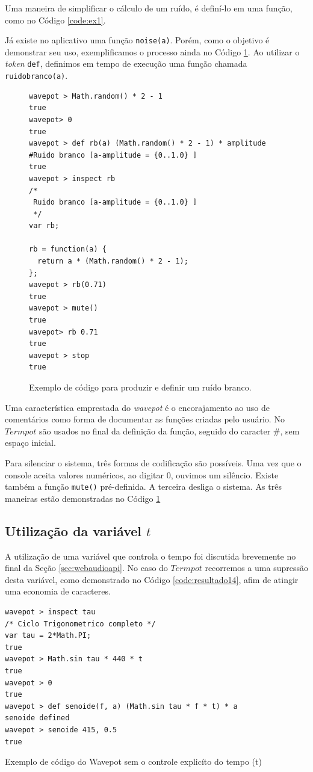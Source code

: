 Uma maneira de simplificar o cálculo de um ruído, é definí-lo em uma função, como no Código \ref{code:ex1}. 

Já existe no aplicativo uma função \verb|noise(a)|.
Porém, como o objetivo é demonstrar seu uso, exemplificamos o processo ainda no Código \ref{code:resultado7}.
Ao  utilizar o \emph{token} \verb|def|, definimos em tempo de execução uma função chamada \verb|ruidobranco(a)|.

\begin{figure}[ht!]
\begin{verbatim}
wavepot > Math.random() * 2 - 1
true
wavepot> 0
true
wavepot > def rb(a) (Math.random() * 2 - 1) * amplitude #Ruido branco [a-amplitude = {0..1.0} ]
true
wavepot > inspect rb
/*
 Ruido branco [a-amplitude = {0..1.0} ]
 */
var rb;

rb = function(a) {
  return a * (Math.random() * 2 - 1);
};
wavepot > rb(0.71)
true
wavepot > mute()
true
wavepot> rb 0.71
true
wavepot > stop
true
\end{verbatim}
\caption{Exemplo de código para produzir e definir um ruído branco.}
\label{code:resultado7}
\end{figure}

Uma característica emprestada do \emph{wavepot} é o encorajamento ao uso de comentários como forma de documentar as funções criadas pelo usuário.
No $Termpot$ são usados no final da definição da função, seguido do caracter \#, sem espaço inicial.

Para silenciar o sistema, três formas de codificação são possíveis.
Uma vez que o console aceita valores numéricos, ao digitar 0, ouvimos um silêncio.
Existe também a função \verb|mute()| pré-definida.
A terceira desliga o sistema.
As três maneiras estão demonstradas no Código \ref{code:resultado7}

\subsection*{Utilização da variável $t$}

A utilização de uma variável que controla o tempo foi discutida brevemente no final da Seção \ref{sec:webaudioapi}.
No caso do $Termpot$ recorremos a uma supressão desta variável, como demonstrado no Código \ref{code:resultado14}, afim de atingir uma economia de caracteres.

\begin{listing}
\begin{verbatim}
wavepot > inspect tau
/* Ciclo Trigonometrico completo */
var tau = 2*Math.PI;
true
wavepot > Math.sin tau * 440 * t
true
wavepot > 0
true
wavepot > def senoide(f, a) (Math.sin tau * f * t) * a
senoide defined
wavepot > senoide 415, 0.5
true
\end{verbatim}
\caption{Exemplo de código do Wavepot sem o controle explicíto do tempo (t)}
\label{code:resultado14}
\end{listing}


